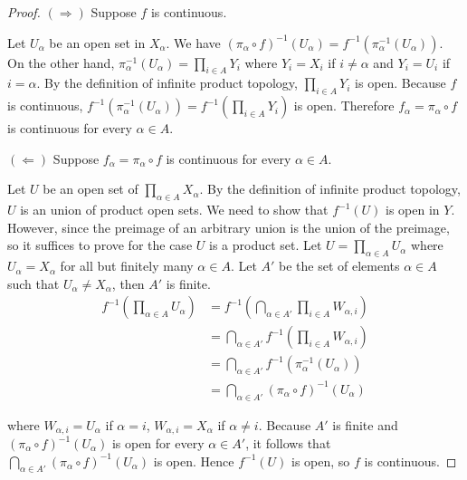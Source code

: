 \begin{proof}
    $(\Longrightarrow)$ Suppose $f$ is continuous.

    Let $U_{\alpha}$ be an open set in $X_{\alpha}$. We have ${(\pi_{\alpha}\circ f)}^{-1}(U_{\alpha}) = f^{-1}(\pi_{\alpha}^{-1}(U_{\alpha}))$. On the other hand, $\pi_{\alpha}^{-1}(U_{\alpha}) = \prod_{i\in A}Y_{i}$ where $Y_{i} = X_{i}$ if $i\ne\alpha$ and $Y_{i} = U_{i}$ if $i = \alpha$. By the definition of infinite product topology, $\prod_{i\in A}Y_{i}$ is open. Because $f$ is continuous, $f^{-1}(\pi_{\alpha}^{-1}(U_{\alpha})) = f^{-1}\left(\prod_{i\in A}Y_{i}\right)$ is open. Therefore $f_{\alpha} = \pi_{\alpha}\circ f$ is continuous for every $\alpha\in A$.

    $(\Longleftarrow)$ Suppose $f_{\alpha} = \pi_{\alpha}\circ f$ is continuous for every $\alpha\in A$.

    Let $U$ be an open set of $\prod_{\alpha\in A}X_{\alpha}$. By the definition of infinite product topology, $U$ is an union of product open sets. We need to show that $f^{-1}(U)$ is open in $Y$. However, since the preimage of an arbitrary union is the union of the preimage, so it suffices to prove for the case $U$ is a product set. Let $U = \prod_{\alpha\in A}U_{\alpha}$ where $U_{\alpha} = X_{\alpha}$ for all but finitely many $\alpha\in A$. Let $A'$ be the set of elements $\alpha\in A$ such that $U_{\alpha}\ne X_{\alpha}$, then $A'$ is finite.
    \begin{align*}
        f^{-1}\left(\prod_{\alpha\in A}U_{\alpha}\right) & = f^{-1}\left(\bigcap_{\alpha\in A'}\prod_{i\in A}W_{\alpha, i}\right) \\
                                                         & = \bigcap_{\alpha\in A'}f^{-1}\left(\prod_{i\in A}W_{\alpha,i}\right)  \\
                                                         & = \bigcap_{\alpha\in A'}f^{-1}(\pi_{\alpha}^{-1}(U_{\alpha}))          \\
                                                         & = \bigcap_{\alpha\in A'}{(\pi_{\alpha}\circ f)}^{-1}(U_{\alpha})
    \end{align*}

    where $W_{\alpha, i} = U_{\alpha}$ if $\alpha = i$, $W_{\alpha, i} = X_{\alpha}$ if $\alpha\ne i$. Because $A'$ is finite and ${(\pi_{\alpha}\circ f)}^{-1}(U_{\alpha})$ is open for every $\alpha\in A'$, it follows that $\bigcap_{\alpha\in A'}{(\pi_{\alpha}\circ f)}^{-1}(U_{\alpha})$ is open. Hence $f^{-1}(U)$ is open, so $f$ is continuous.


\end{proof}
